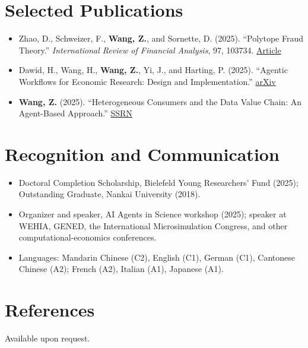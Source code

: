\documentclass[a4paper,11pt]{article}
\begin{document}
\section{Selected Publications}
\begin{itemize}
  \item Zhao, D., Schweizer, F., \textbf{Wang, Z.}, and Sornette, D. (2025). ``Polytope Fraud Theory.'' \textit{International Review of Financial Analysis}, 97, 103734. \href{https://www.sciencedirect.com/science/article/pii/S1057521924006665}{Article}
  \item Dawid, H., Wang, H., \textbf{Wang, Z.}, Yi, J., and Harting, P. (2025). ``Agentic Workflows for Economic Research: Design and Implementation.'' \href{https://arxiv.org/abs/2504.09736}{arXiv}
  \item \textbf{Wang, Z.} (2025). ``Heterogeneous Consumers and the Data Value Chain: An Agent-Based Approach.'' \href{https://papers.ssrn.com/sol3/papers.cfm?abstract_id=5235196}{SSRN}
\end{itemize}

\section{Recognition and Communication}
\begin{itemize}
  \item Doctoral Completion Scholarship, Bielefeld Young Researchers' Fund (2025); Outstanding Graduate, Nankai University (2018).
  \item Organizer and speaker, AI Agents in Science workshop (2025); speaker at WEHIA, GENED, the International Microsimulation Congress, and other computational-economics conferences.
  \item Languages: Mandarin Chinese (C2), English (C1), German (C1), Cantonese Chinese (A2); French (A2), Italian (A1), Japanese (A1).
\end{itemize}

\section{References}
Available upon request.
\end{document}
